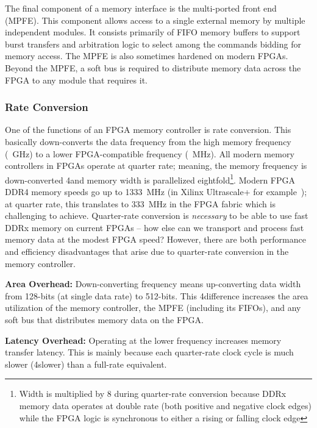 The final component of a memory interface is the multi-ported front end (MPFE).
This component allows access to a single external memory by multiple independent modules.
It consists primarily of FIFO memory buffers to support burst transfers and arbitration logic to select among the commands bidding for memory access.
The MPFE is also sometimes hardened on modern FPGAs.
Beyond the MPFE, a soft bus is required to distribute memory data across the FPGA to any module that requires it.

%
\subsubsection{Rate Conversion}
%

One of the functions of an FPGA memory controller is rate conversion.
This basically down-converts the data frequency from the high memory frequency (~GHz) to a lower FPGA-compatible frequency (~MHz).
All modern memory controllers in FPGAs operate at quarter rate; meaning, the memory frequency is down-converted 4\xx and memory width is parallelized eightfold\footnote{Width is multiplied by 8 during quarter-rate conversion because DDRx memory data operates at double rate (both positive and negative clock edges) while the FPGA logic is synchronous to either a rising or falling clock edge}.
Modern FPGA DDR4 memory speeds go up to 1333~MHz (in Xilinx Ultrascale+ for example~\cite{xemif}); at quarter rate, this translates to 333~MHz in the FPGA fabric which is challenging to achieve.
Quarter-rate conversion is \textit{necessary} to be able to use fast DDRx memory on current FPGAs -- how else can we transport and process fast memory data at the modest FPGA speed?
However, there are both performance and efficiency disadvantages that arise due to quarter-rate conversion in the memory controller.

\textbf{Area Overhead:} Down-converting frequency means up-converting data width from 128-bits (at single data rate) to 512-bits.
This 4\xx difference increases the area utilization of the memory controller, the MPFE (including its FIFOs), and any soft bus that distributes memory data on the FPGA.

\textbf{Latency Overhead:} Operating at the lower frequency increases memory transfer latency.
This is mainly because each quarter-rate clock cycle is much slower (4\xx slower) than a full-rate equivalent.

%
